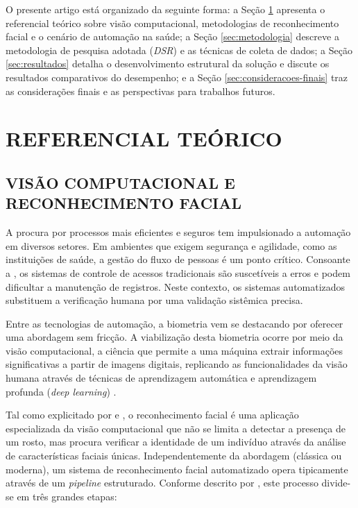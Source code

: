 O presente artigo está organizado da seguinte forma: a Seção \ref{sec:referencial} apresenta o referencial teórico sobre visão computacional, metodologias de reconhecimento facial e o cenário de automação na saúde; a Seção \ref{sec:metodologia} descreve a metodologia de pesquisa adotada (\textit{DSR}) e as técnicas de coleta de dados; a Seção \ref{sec:resultados} detalha o desenvolvimento estrutural da solução e discute os resultados comparativos do desempenho; e a Seção \ref{sec:consideracoes-finais} traz as considerações finais e as perspectivas para trabalhos futuros.

\section{REFERENCIAL TEÓRICO}
\label{sec:referencial}

\subsection{VISÃO COMPUTACIONAL E RECONHECIMENTO FACIAL}
\label{subsec:controle-visao}

A procura por processos mais eficientes e seguros tem impulsionado a automação em diversos setores. Em ambientes que exigem segurança e agilidade, como as instituições de saúde, a gestão do fluxo de pessoas é um ponto crítico. Consoante a , os sistemas de controle de acessos tradicionais são suscetíveis a erros e podem dificultar a manutenção de registros. Neste contexto, os sistemas automatizados substituem a verificação humana por uma validação sistêmica precisa.

Entre as tecnologias de automação, a biometria vem se destacando por oferecer uma abordagem sem fricção. A viabilização desta biometria ocorre por meio da visão computacional, a ciência que permite a uma máquina extrair informações significativas a partir de imagens digitais, replicando as funcionalidades da visão humana através de técnicas de aprendizagem automática e aprendizagem profunda (\textit{deep learning}) \cite{de2014visao,Taigman_2014_CVPR}.

Tal como explicitado por  e , o reconhecimento facial é uma aplicação especializada da visão computacional que não se limita a detectar a presença de um rosto, mas procura verificar a identidade de um indivíduo através da análise de características faciais únicas. Independentemente da abordagem (clássica ou moderna), um sistema de reconhecimento facial automatizado opera tipicamente através de um \textit{pipeline} estruturado. Conforme descrito por , este processo divide-se em três grandes etapas:

